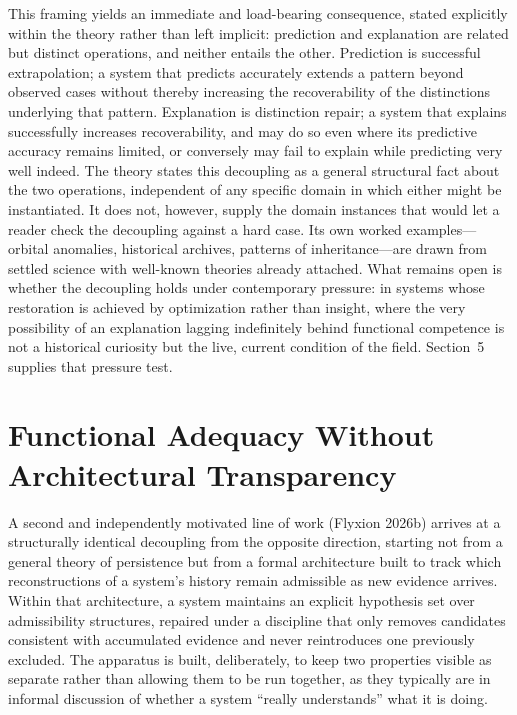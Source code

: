 \documentclass[11pt]{article}
\theoremstyle{plain}
\begin{document}
This framing yields an immediate and load-bearing consequence, stated explicitly within the theory rather than left implicit: prediction and explanation are related but distinct operations, and neither entails the other. Prediction is successful extrapolation; a system that predicts accurately extends a pattern beyond observed cases without thereby increasing the recoverability of the distinctions underlying that pattern. Explanation is distinction repair; a system that explains successfully increases recoverability, and may do so even where its predictive accuracy remains limited, or conversely may fail to explain while predicting very well indeed. The theory states this decoupling as a general structural fact about the two operations, independent of any specific domain in which either might be instantiated. It does not, however, supply the domain instances that would let a reader check the decoupling against a hard case. Its own worked examples---orbital anomalies, historical archives, patterns of inheritance---are drawn from settled science with well-known theories already attached. What remains open is whether the decoupling holds under contemporary pressure: in systems whose restoration is achieved by optimization rather than insight, where the very possibility of an explanation lagging indefinitely behind functional competence is not a historical curiosity but the live, current condition of the field. Section~5 supplies that pressure test.

\section{Functional Adequacy Without Architectural Transparency}
\label{sec:functional-adequacy}

A second and independently motivated line of work (Flyxion 2026b) arrives at a structurally identical decoupling from the opposite direction, starting not from a general theory of persistence but from a formal architecture built to track which reconstructions of a system's history remain admissible as new evidence arrives. Within that architecture, a system maintains an explicit hypothesis set over admissibility structures, repaired under a discipline that only removes candidates consistent with accumulated evidence and never reintroduces one previously excluded. The apparatus is built, deliberately, to keep two properties visible as separate rather than allowing them to be run together, as they typically are in informal discussion of whether a system ``really understands'' what it is doing.
\end{document}
